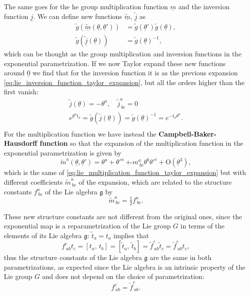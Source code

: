 The same goes for the he group multiplication function \(\underline{m}\) and the inversion function \(\underline{j}\). We can define new functions \(\tilde{\underline{m}}\), \(\tilde{\underline{j}}\) as
\[
    \begin{aligned}
        \tilde{g}(\tilde{\underline{m}}(\underline{\theta}, \underline{\theta}')) & = \tilde{g}(\underline{\theta}') \tilde{g}(\underline{\theta}), \\
        \tilde{g}(\tilde{\underline{j}}(\underline{\theta}))                      & = \tilde{g}(\underline{\theta})^{-1},
    \end{aligned}
\]
which can be thought as the group multiplication and inversion functions in the exponential parametrization. If we now Taylor expand these new functions around \(\underline{0}\) we find that for the inversion function it is as the previous expansion \eqref{eq:lie_inversion_function_taylor_expansion}, but all the orders higher than the first vanish:
\[
    \begin{aligned}
        \tilde{j}(\underline{\theta}) = - \theta^a, \quad \tilde{j}^a_{\ bc} = 0                                                          \\
        e^{\underline{\theta}^a t_a} = \tilde{g}(\tilde{j}(\underline{\theta})) = \tilde{g}(\underline{\theta})^{-1} = e^{-t_a \theta^a}. \\
    \end{aligned}
\]
For the multiplication function we have instead the \textbf{Campbell-Baker-Hausdorff function} so that the expansion of the multiplication function in the exponential parametrization is given by
\[
    \tilde{m}^a(\underline{\theta}, \underline{\theta}') = \theta^a + \theta'^a + \tilde{}{m}^a_{\ bc} \theta^b \theta'^c + \mathrm{O}(\underline{\theta}^3),
\]
which is the same of \eqref{eq:lie_multiplication_function_taylor_expansion} but with different coefficients \(\tilde{m}^a_{\ bc}\) of the expansion, which are related to the structure constants \(f^a_{\ bc}\) of the Lie algebra \(\mathfrak{g}\) by
\[
    \tilde{m}^a_{\ bc} = \tfrac{1}{2} f^a_{\ bc}.
\]

These new structure constants are not different from the original ones, since the exponential map is a reparametrization of the Lie group \(G\) in terms of the elements of its Lie algebra \(\mathfrak{g}\): \(\tilde{t}_a = t_a\) implies that
\[
    f^c_{\ ab} t_c = \left[ t_a,\,t_b \right] = \left[ \tilde{t}_a,\,\tilde{t}_b \right] = \tilde{f}^c_{\ ab} \tilde{t}_c = \tilde{f}^c_{\ ab} t_c,
\]
thus the structure constants of the Lie algebra \(\mathfrak{g}\) are the same in both parametrizations, as expected since the Lie algebra is an intrinsic property of the Lie group \(G\) and does not depend on the choice of parametrization:
\[
    f^c_{\ ab} = \tilde{f}^c_{\ ab}.
\]

